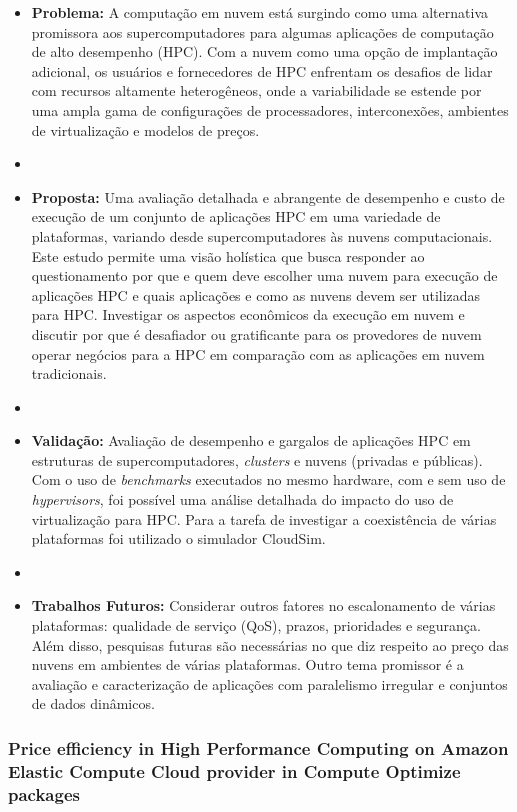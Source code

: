 \documentclass[tese,capa]{texufpel}
\begin{document}
\begin{itemize}[label={},noitemsep]
  \item \textbf{Problema:} A computação em nuvem está surgindo como uma alternativa promissora aos supercomputadores para algumas aplicações de computação de alto desempenho (HPC). Com a nuvem como uma opção de implantação adicional, os usuários e fornecedores de HPC enfrentam os desafios de lidar com recursos altamente heterogêneos, onde a variabilidade se estende por uma ampla gama de configurações de processadores, interconexões, ambientes de virtualização e modelos de preços.
  \item 
  \item \textbf{Proposta:} Uma avaliação detalhada e abrangente de desempenho e custo de execução de um conjunto de aplicações HPC em uma variedade de plataformas, variando desde supercomputadores às nuvens computacionais. Este estudo permite uma visão holística que busca responder ao questionamento por que e quem deve escolher uma nuvem para execução de aplicações HPC e quais aplicações e como as nuvens devem ser utilizadas para HPC. Investigar os aspectos econômicos da execução em nuvem e discutir por que é desafiador ou gratificante para os provedores de nuvem operar negócios para a HPC em comparação com as aplicações em nuvem tradicionais.
  \item 
  \item \textbf{Validação:} Avaliação de desempenho e gargalos de aplicações HPC em estruturas de supercomputadores, \textit{clusters} e nuvens (privadas e públicas). Com o uso de \textit{benchmarks} executados no mesmo hardware, com e sem uso de \textit{hypervisors}, foi possível uma análise detalhada do impacto do uso de virtualização para HPC. Para a tarefa de investigar a coexistência de várias plataformas foi utilizado o simulador CloudSim.
  \item 
  \item \textbf{Trabalhos Futuros:} Considerar outros fatores no escalonamento de várias plataformas: qualidade de serviço (QoS), prazos, prioridades e segurança. Além disso, pesquisas futuras são necessárias no que diz respeito ao preço das nuvens em ambientes de várias plataformas. Outro tema promissor é a avaliação e caracterização de aplicações com paralelismo irregular e conjuntos de dados dinâmicos.
\end{itemize}

\subsubsection{Price efficiency in High Performance Computing on Amazon Elastic Compute Cloud provider in Compute Optimize packages \cite{prukkantragornPriceEfficiencyHigh2016b}}
\end{document}
